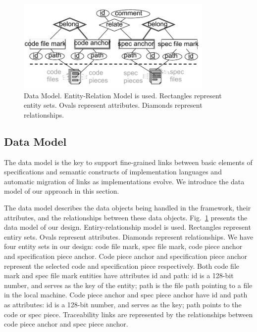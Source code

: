 \begin{figure}
\begin{center}
\includegraphics[width=0.85\textwidth]{datamodel}
\caption{Data Model. Entity-Relation Model is used. Rectangles represent entity sets. Ovals represent attributes. Diamonds represent relationships.}
\label{fig:datamodel}
\end{center}
\end{figure}

\subsection{Data Model}
The data model is the key to support fine-grained links between basic elements of specifications and semantic constructs of implementation languages and automatic migration of links as implementations evolve. We introduce the data model of our approach in this section.

The data model describes the data objects being handled in the framework, their attributes, and the relationships between these data objects.
Fig.~\ref{fig:datamodel} presents the data model of our design.
Entiry-relationship model is used.
Rectangles represent entiry sets.
Ovals represent attributes.
Diamonds represent relationships.
We have four entity sets in our design: code file mark, spec file mark, code piece anchor and specification piece anchor.
Code piece anchor and specification piece anchor represent the selected code and specification piece respectively.
Both code file mark and spec file mark entities have attributes id and path:
id is a 128-bit number, and serves as the key of the entity;
path is the file path pointing to a file in the local machine. %
Code piece anchor and spec piece anchor have id and path as attributes:
id is a 128-bit number, and serves as the key;
path points to the code or spec piece.
Traceability links are represented by the relationships between code piece anchor and spec piece anchor.

